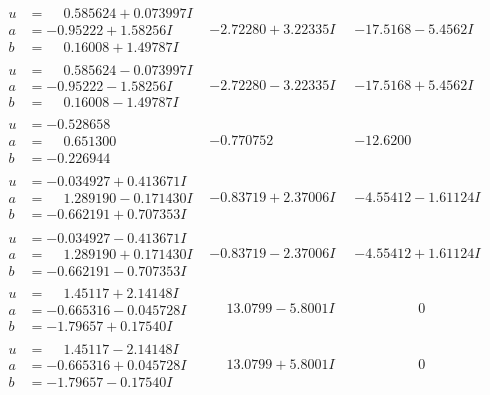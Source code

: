 \documentclass[1p]{elsarticle_modified}
\theoremstyle{definition}
\begin{document}
$$\begin{array}{c|c|c}
\begin{aligned}
u &= \phantom{-}0.585624 + 0.073997 I \\
a &= -0.95222 + 1.58256 I \\
b &= \phantom{-}0.16008 + 1.49787 I\end{aligned}
 & -2.72280 + 3.22335 I & -17.5168 - 5.4562 I \\ \hline\begin{aligned}
u &= \phantom{-}0.585624 - 0.073997 I \\
a &= -0.95222 - 1.58256 I \\
b &= \phantom{-}0.16008 - 1.49787 I\end{aligned}
 & -2.72280 - 3.22335 I & -17.5168 + 5.4562 I \\ \hline\begin{aligned}
u &= -0.528658\phantom{ +0.000000I} \\
a &= \phantom{-}0.651300\phantom{ +0.000000I} \\
b &= -0.226944\phantom{ +0.000000I}\end{aligned}
 & -0.770752\phantom{ +0.000000I} & -12.6200\phantom{ +0.000000I} \\ \hline\begin{aligned}
u &= -0.034927 + 0.413671 I \\
a &= \phantom{-}1.289190 - 0.171430 I \\
b &= -0.662191 + 0.707353 I\end{aligned}
 & -0.83719 + 2.37006 I & -4.55412 - 1.61124 I \\ \hline\begin{aligned}
u &= -0.034927 - 0.413671 I \\
a &= \phantom{-}1.289190 + 0.171430 I \\
b &= -0.662191 - 0.707353 I\end{aligned}
 & -0.83719 - 2.37006 I & -4.55412 + 1.61124 I \\ \hline\begin{aligned}
u &= \phantom{-}1.45117 + 2.14148 I \\
a &= -0.665316 - 0.045728 I \\
b &= -1.79657 + 0.17540 I\end{aligned}
 & \phantom{-}13.0799 - 5.8001 I & \phantom{-0.000000 } 0 \\ \hline\begin{aligned}
u &= \phantom{-}1.45117 - 2.14148 I \\
a &= -0.665316 + 0.045728 I \\
b &= -1.79657 - 0.17540 I\end{aligned}
 & \phantom{-}13.0799 + 5.8001 I & \phantom{-0.000000 } 0 \\ \hline\begin{aligned}

\end{aligned}
\end{array}$$
\end{document}
